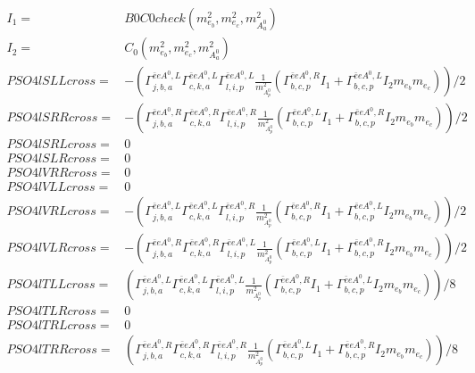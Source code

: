 \documentclass[A4,landscape]{article}
\begin{document}
\begin{align} 
I_1= & B0C0check(m^2_{e_{{b}}}, m^2_{e_{{c}}}, m^2_{A^0_{{a}}}) \\ 
I_2= & C_0(m^2_{e_{{b}}}, m^2_{e_{{c}}}, m^2_{A^0_{{a}}}) \\ 
  PSO4lSLLcross= & -( \Gamma^{\bar{e}e A^0 ,L}_{j, b, a} \Gamma^{\bar{e}e A^0 ,L}_{c, k, a} \Gamma^{\bar{e}e A^0 ,L}_{l, i, p} \frac{1}{m^2_{A^0_{{p}}}} (\Gamma^{\bar{e}e A^0 ,R}_{b, c, p} I_1 + \Gamma^{\bar{e}e A^0 ,L}_{b, c, p} I_2 m_{e_{{b}}} m_{e_{{c}}}))/2 \\ 
  PSO4lSRRcross= & -( \Gamma^{\bar{e}e A^0 ,R}_{j, b, a} \Gamma^{\bar{e}e A^0 ,R}_{c, k, a} \Gamma^{\bar{e}e A^0 ,R}_{l, i, p} \frac{1}{m^2_{A^0_{{p}}}} (\Gamma^{\bar{e}e A^0 ,L}_{b, c, p} I_1 + \Gamma^{\bar{e}e A^0 ,R}_{b, c, p} I_2 m_{e_{{b}}} m_{e_{{c}}}))/2 \\ 
  PSO4lSRLcross= & 0 \\ 
  PSO4lSLRcross= & 0 \\ 
  PSO4lVRRcross= & 0 \\ 
  PSO4lVLLcross= & 0 \\ 
  PSO4lVRLcross= & -( \Gamma^{\bar{e}e A^0 ,L}_{j, b, a} \Gamma^{\bar{e}e A^0 ,L}_{c, k, a} \Gamma^{\bar{e}e A^0 ,R}_{l, i, p} \frac{1}{m^2_{A^0_{{p}}}} (\Gamma^{\bar{e}e A^0 ,R}_{b, c, p} I_1 + \Gamma^{\bar{e}e A^0 ,L}_{b, c, p} I_2 m_{e_{{b}}} m_{e_{{c}}}))/2 \\ 
  PSO4lVLRcross= & -( \Gamma^{\bar{e}e A^0 ,R}_{j, b, a} \Gamma^{\bar{e}e A^0 ,R}_{c, k, a} \Gamma^{\bar{e}e A^0 ,L}_{l, i, p} \frac{1}{m^2_{A^0_{{p}}}} (\Gamma^{\bar{e}e A^0 ,L}_{b, c, p} I_1 + \Gamma^{\bar{e}e A^0 ,R}_{b, c, p} I_2 m_{e_{{b}}} m_{e_{{c}}}))/2 \\ 
  PSO4lTLLcross= & ( \Gamma^{\bar{e}e A^0 ,L}_{j, b, a} \Gamma^{\bar{e}e A^0 ,L}_{c, k, a} \Gamma^{\bar{e}e A^0 ,L}_{l, i, p} \frac{1}{m^2_{A^0_{{p}}}} (\Gamma^{\bar{e}e A^0 ,R}_{b, c, p} I_1 + \Gamma^{\bar{e}e A^0 ,L}_{b, c, p} I_2 m_{e_{{b}}} m_{e_{{c}}}))/8 \\ 
  PSO4lTLRcross= & 0 \\ 
  PSO4lTRLcross= & 0 \\ 
  PSO4lTRRcross= & ( \Gamma^{\bar{e}e A^0 ,R}_{j, b, a} \Gamma^{\bar{e}e A^0 ,R}_{c, k, a} \Gamma^{\bar{e}e A^0 ,R}_{l, i, p} \frac{1}{m^2_{A^0_{{p}}}} (\Gamma^{\bar{e}e A^0 ,L}_{b, c, p} I_1 + \Gamma^{\bar{e}e A^0 ,R}_{b, c, p} I_2 m_{e_{{b}}} m_{e_{{c}}}))/8 \\ 
\end{align} 
\end{document}
